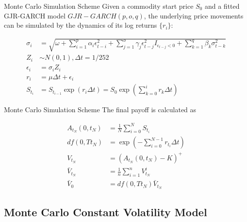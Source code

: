 \documentclass[8pt]{beamer}
\numberwithin{equation}{section}
\begin{document}
\begin{frame}{Monte Carlo Simulation Scheme}
Given a commodity start price $S_0$ and a fitted GJR-GARCH model $GJR-GARCH(p,o,q)$, the underlying price movements can be simulated by the dynamics of its log returns $\{r_i\}$:

\begin{equation}
\begin{aligned}
\sigma_i &= \sqrt{\omega + \sum_{i=1}^p {\alpha_i \epsilon_{t-i}^2} + \sum_{j=1}^o {\gamma_j \epsilon_{t-j}^2 I_{\epsilon_{t-j} < 0}} + \sum_{k=1}^q {\beta_k \sigma_{t-k}^2}}
\\
Z_i &\sim N(0,1), \Delta t = 1/252
\\
\epsilon_i &= \sigma_i Z_i
\\
r_i &= \mu \Delta t + \epsilon_i
\\
S_{t_i} &=S_{t_{i-1}}\exp(r_i \Delta t) = S_0\exp(\sum_{k=0}^i r_k \Delta t)
\end{aligned}
\end{equation}
\end{frame}

\begin{frame}{Monte Carlo Simulation Scheme}
The final payoff is calculated as

\begin{equation}
\begin{aligned}
A_{t_N}(0,t_N) &= \frac 1N \sum_{i=0}^N S_{t_i}
\\
df(0,Tt_N) &= \exp (-\sum_{i=0}^{N-1} r_{t_i}\Delta t)
\\
V_{t_N} &= (A_{t_N}(0,t_N) - K)^+
\\
\bar V_{t_N} &= \frac 1n \sum_{i=1}^n V_{t_N}^i
\\
\bar V_0 &= df(0,Tt_N) \bar V_{t_N}
\end{aligned}
\end{equation}

\end{frame}

\subsection{Monte Carlo Constant Volatility Model}
\end{document}
